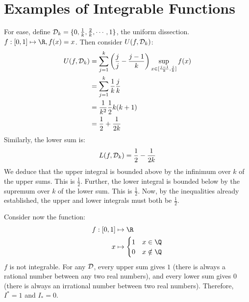 \documentclass[../Main.tex]{subfiles}
\begin{document}
\section{Examples of Integrable Functions}
\begin{example}
    For ease, define $\mathcal{D}_k = \{0, \frac{1}{k}, \frac{2}{k}, \cdots, 1\}$, the uniform dissection.
    $f : [0, 1] \mapsto \R, f(x) = x$.
    Then consider $U(f, \mathcal{D}_k)$:
    \begin{align*}
        U(f, \mathcal{D}_k) &= \sum_{j = 1}^k \left(\frac{j}{j} - \frac{j - 1}{k}\right) \sup_{x \in [\frac{j - 1}{k}, \frac{j}{k}]} f(x) \\
        &= \sum_{j = 1}^k \frac{1}{k} \frac{j}{k} \\
        &= \frac{1}{k^2} \frac{1}{2} k(k + 1) \\
        &= \frac{1}{2} + \frac{1}{2k}
    \end{align*}
    Similarly, the lower sum is:
    \begin{equation*}
        L(f, \mathcal{D}_k) = \frac{1}{2} - \frac{1}{2k}
    \end{equation*}
    We deduce that the upper integral is bounded above by the infinimum over $k$ of the upper sums. This is $\frac{1}{2}$. Further, the lower integral is bounded below by the supremum over $k$ of the lower sum. This is $\frac{1}{2}$. Now, by the inequalities already established, the upper and lower integrals must both be $\frac{1}{2}$.
\end{example}
\begin{example}
    Consider now the function:
    \begin{align*}
        f : [0, 1] &\mapsto \R \\
        x &\mapsto
        \begin{cases}
            1 & x \in \Q \\
            0 & x \notin \Q 
        \end{cases}
    \end{align*}
    $f$ is not integrable. For any $\mathcal{D}$, every upper sum gives $1$ (there is always a rational number between any two real numbers), and every lower sum gives $0$ (there is always an irrational number between two real numbers). Therefore, $I^* = 1$ and $I_* = 0$.
\end{example}
\end{document}
